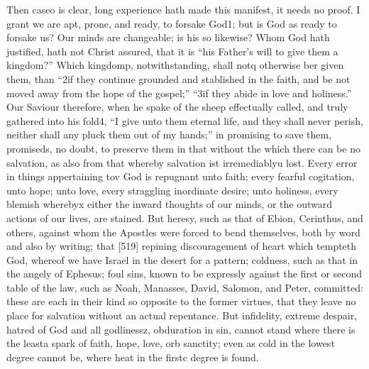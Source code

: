 Then caseo is clear, long experience hath made this manifest, it needs no proof. I grant we are apt, prone, and ready, to forsake God1; but is God as ready to forsake us? Our minds are changeable; is his so likewise? Whom God hath justified, hath not Christ assured, that it is “his Father’s will to give them a kingdom?” Which kingdomp, notwithstanding, shall notq otherwise ber given them, than “2if they continue grounded and stablished in the faith, and be not moved away from the hope of the gospel;” “3if they abide in love and holiness.” Our Saviour therefore, when he spake of the sheep effectually called, and truly gathered into his fold4, “I give unto them eternal life, and they shall never perish, neither shall any pluck them out of my hands;” in promising to save them, promiseds, no doubt, to preserve them in that without the which there can be no salvation, as also from that whereby salvation ist irremediablyu lost. Every error in things appertaining tov God is repugnant unto faith; every fearful cogitation, unto hope; unto love, every straggling inordinate desire; unto holiness, every blemish wherebyx either the inward thoughts of our minds, or the outward actions of our lives, are stained. But heresy, such as that of Ebion, Cerinthus, and others, against whom the Apostles were forced to bend themselves, both by word and also by writing; that [519] repining discouragement of heart which tempteth God, whereof we have Israel in the desert for a pattern; coldness, such as that in the angely of Ephesus; foul sins, known to be expressly against the first or second table of the law, such as Noah, Manasses, David, Salomon, and Peter, committed: these are each in their kind so opposite to the former virtues, that they leave no place for salvation without an actual repentance. But infidelity, extreme despair, hatred of God and all godlinessz, obduration in sin, cannot stand where there is the leasta spark of faith, hope, love, orb sanctity; even as cold in the lowest degree cannot be, where heat in the firstc degree is found.

